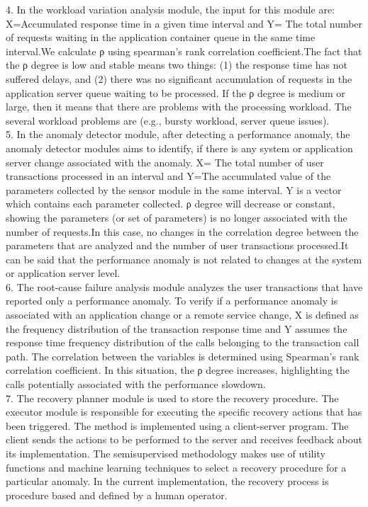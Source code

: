\begin{compactitem}
4. In the workload variation analysis module, the input for this module are: X=Accumulated response time in a given time interval and Y= The total number of requests waiting in the application container queue in the same time interval.We calculate ρ using spearman’s rank correlation coefficient.The fact that the ρ degree is low and stable means two things: (1) the response time has not suffered delays, and (2) there was no significant accumulation of requests in the application server queue waiting to be processed. If the ρ degree is medium or large, then it means that there are problems with the processing workload. The several workload problems are (e.g., bursty workload, server queue issues).\\

5. In the anomaly detector module, after detecting a performance anomaly, the anomaly detector modules aims to identify, if there is any system or application server change associated with the anomaly. X= The total number of user transactions processed in an interval and Y=The accumulated value of the parameters collected by the sensor module in the same interval. Y is a vector which contains each parameter collected. ρ degree will decrease or constant, showing the parameters (or set of parameters) is no longer associated with the number of requests.In this case, no changes in the correlation degree between the parameters that are analyzed and the number of user transactions processed.It can be said that the performance anomaly is not related to changes at the system or application server level.\\

6. The root-cause failure analysis module analyzes the user transactions that have reported only a performance anomaly. To verify if a performance anomaly is associated with an application change or a remote service change, X is defined as the frequency distribution of the transaction response time and Y assumes the response time frequency distribution of the calls belonging to the transaction call path. The correlation between the variables is determined using Spearman’s rank correlation coefficient. In this situation, the ρ degree increases, highlighting the calls potentially associated with the performance slowdown.\\

7. The recovery planner module is used to store the recovery procedure. The executor module is responsible for executing the specific recovery actions that has been triggered. The method is implemented using a client-server program. The client sends the actions to be performed to the server and receives feedback about its implementation. The semisupervised methodology makes use of utility functions and machine learning techniques to select a recovery procedure for a  particular anomaly. In the current implementation, the recovery process is procedure based and defined by a human operator.


\end{compactitem}
